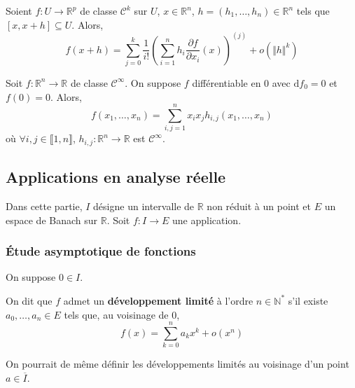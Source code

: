   \begin{theorem}
    Soient $f : U \rightarrow \mathbb{R}^p$ de classe $\mathcal{C}^k$ sur $U$, $x \in \mathbb{R}^n$, $h = (h_1, \dots, h_n) \in \mathbb{R}^n$ tels que $[x,x+h] \subseteq U$. Alors,
    \[ f(x+h) = \sum_{j=0}^{k} \frac{1}{i!} \left( \sum_{i=1}^n h_i \frac{\partial f}{\partial x_i} (x) \right)^{(j)} + o(\Vert h \Vert^k) \]
  \end{theorem}

  \begin{application}
    Soit $f : \mathbb{R}^n \rightarrow \mathbb{R}$ de classe $\mathcal{C}^\infty$. On suppose $f$ différentiable en $0$ avec $\mathrm{d}f_0 = 0$ et $f(0) = 0$. Alors,
    \[ f(x_1, \dots, x_n) = \sum_{i,j=1}^n x_i x_j h_{i,j}(x_1, \dots, x_n) \]
    où $\forall i,j \in \llbracket 1, n \rrbracket$, $h_{i,j} : \mathbb{R}^n \rightarrow \mathbb{R}$ est $\mathcal{C}^\infty$.
  \end{application}

  \subsection{Applications en analyse réelle}

  Dans cette partie, $I$ désigne un intervalle de $\mathbb{R}$ non réduit à un point et $E$ un espace de Banach sur $\mathbb{R}$. Soit $f : I \rightarrow E$ une application.

  \subsubsection{Étude asymptotique de fonctions}


  On suppose $0 \in I$.

  \begin{definition}
    On dit que $f$ admet un \textbf{développement limité} à l'ordre $n \in \mathbb{N}^*$ s'il existe $a_0, \dots, a_n \in E$ tels que, au voisinage de $0$,
    \[ f(x) = \sum_{k=0}^{n} a_k x^k + o(x^n) \]
  \end{definition}

  \begin{remark}
    On pourrait de même définir les développements limités au voisinage d'un point $a \in \overline{I}$.
  \end{remark}

